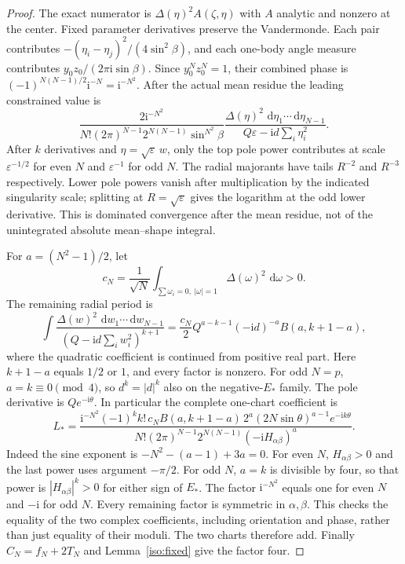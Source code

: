 \documentclass[11pt]{article}
\numberwithin{equation}{section}
\theoremstyle{definition}
\newcommand{\ii}{\mathrm i}
\newcommand{\dd}{\,\mathrm d}
\newcommand{\eps}{\varepsilon}
\begin{document}
\begin{proof}
The exact numerator is $\Delta(\eta)^2 A(\zeta,\eta)$ with $A$ analytic
and nonzero at the center. Fixed parameter derivatives preserve the
Vandermonde. Each pair contributes
$-(\eta_i-\eta_j)^2/(4\sin^2\beta)$, and each one-body angle measure
contributes $y_0z_0/(2\pi\ii\sin\beta)$. Since $y_0^Nz_0^N=1$,
their combined phase is
$(-1)^{N(N-1)/2}\ii^{-N}=\ii^{-N^2}$.
After the actual mean residue the leading constrained value is
\[
 \frac{2\ii^{-N^2}}{N!(2\pi)^{N-1}2^{N(N-1)}\sin^{N^2}\beta}
 \frac{\Delta(\eta)^2\,\dd\eta_1\cdots\dd\eta_{N-1}}
 {Q\eps-\ii d\sum_i\eta_i^2}.
\]
After $k$ derivatives and $\eta=\sqrt\eps\,w$, only the top pole
power contributes at scale $\eps^{-1/2}$ for even $N$ and
$\eps^{-1}$ for odd $N$. The radial majorants have tails $R^{-2}$
and $R^{-3}$ respectively. Lower pole powers vanish after multiplication
by the indicated singularity scale; splitting at $R=\sqrt\eps$ gives
the logarithm at the odd lower derivative. This is dominated convergence
after the mean residue, not of the unintegrated absolute mean--shape
integral.

For $a=(N^2-1)/2$, let
\[
 c_N=\frac1{\sqrt N}\int_{\sum\omega_i=0,\ |\omega|=1}
                         \Delta(\omega)^2\,\dd\omega>0.
\]
The remaining radial period is
\[
 \int\frac{\Delta(w)^2\,\dd w_1\cdots\dd w_{N-1}}
 {(Q-\ii d\sum_iw_i^2)^{k+1}}
 =\frac{c_N}{2}Q^{a-k-1}(-\ii d)^{-a}
 B(a,k+1-a),
\]
where the quadratic coefficient is continued from positive real part.
Here $k+1-a$ equals $1/2$ or $1$, and every factor is nonzero.
For odd $N=p$, $a=k\equiv0\pmod4$, so $d^k=|d|^k$ also on the
negative-$E_*$ family. The pole derivative is $Qe^{-\ii\theta}$.
In particular the complete one-chart coefficient is
\begin{equation}
 L_*=
 \frac{\ii^{-N^2}(-1)^k k!\,c_N B(a,k+1-a)\,
       2^a(2N\sin\theta)^{a-1}e^{-\ii k\theta}}
 {N!(2\pi)^{N-1}2^{N(N-1)}(-\ii H_{\alpha\beta})^a}.
 \label{iso:amplitude}
\end{equation}
Indeed the sine exponent is $-N^2-(a-1)+3a=0$.
For even $N$, $H_{\alpha\beta}>0$ and the last power uses argument
$-\pi/2$. For odd $N$, $a=k$ is divisible by four, so that power is
$|H_{\alpha\beta}|^k>0$ for either sign of $E_*$.
The factor $\ii^{-N^2}$ equals one for even $N$ and $-\ii$ for odd
$N$. Every remaining factor is symmetric in $\alpha,\beta$.
This checks the equality of the two complex coefficients, including
orientation and phase, rather than just equality of their moduli.
The two charts therefore add. Finally
$C_N=f_N+2T_N$ and Lemma~\ref{iso:fixed} give the factor four.
\end{proof}
\end{document}
